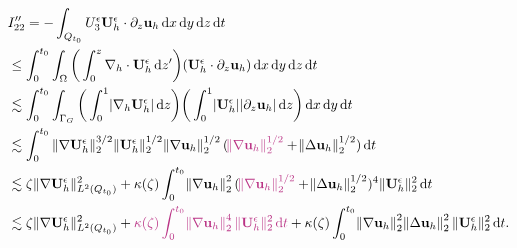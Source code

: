 \documentclass{beamer}
\newcommand*\diff{\mathop{}\!\mathrm{d}}
\begin{document}
\begin{frame}
\changefontsizes{9pt}

  \begin{equation} \nonumber
    \begin{split}
      & I_{22}'' = - \int_{Q_{t_0}}  U^\epsilon_3 \mathbf{U}_h^\epsilon \cdot \partial_z \mathbf{u}_h \diff x \diff y \diff z \diff t \\
      & \leq \int_0^{t_0} \int_\Omega \bigg ( \int_0^z \nabla_h \cdot \mathbf{U}_h^\epsilon \diff z' \bigg ) (\mathbf{U}_h^\epsilon \cdot \partial_z \mathbf{u}_h) \diff x \diff y \diff z \diff t \\
      & \lesssim \int_0^{t_0} \int_{\Gamma_G} \bigg ( \int_0^1 \abs{\nabla_h \mathbf{U}_h^\epsilon} \diff z \bigg) \bigg ( \int_0^1 \abs{\mathbf{U}_h^\epsilon} \abs{\partial_z \mathbf{u}_h} \diff z \bigg ) \diff x \diff y \diff t \\
      & \lesssim \int_0^{t_0} \| \nabla \mathbf{U}_h^\epsilon \| _2^{3/2} \| \mathbf{U}_h^\epsilon \| _2^{1/2} \norm{\nabla \mathbf{u}_h}_2^{1/2} (\textcolor{mediumred-violet}{\norm{\nabla \mathbf{u}_h}_2^{1/2}} + \norm{\Delta \mathbf{u}_h}_2^{1/2}) \diff t \\
      & \lesssim \zeta \| \nabla \mathbf{U}_h^\epsilon \|_{L^2(Q_{t_0})}^2 + \kappa(\zeta) \int_0^{t_0} \norm{\nabla \mathbf{u}_h}_2^2 (\textcolor{mediumred-violet}{\norm{\nabla \mathbf{u}_h}_2^{1/2}} + \norm{\Delta \mathbf{u}_h}_2^{1/2})^4 \| \mathbf{U}_h^\epsilon \|_2^2 \diff t \\
      & \lesssim \zeta \| \nabla \mathbf{U}_h^\epsilon \|_{L^2(Q_{t_0})}^2 + \textcolor{mediumred-violet}{\kappa(\zeta) \int_0^{t_0} \norm{\nabla \mathbf{u}_h}_2^4 \| \mathbf{U}_h^\epsilon \|_2^2 \diff t} + \kappa(\zeta) \int_0^{t_0} \norm{\nabla \mathbf{u}_h}_2^2  \norm{\Delta \mathbf{u}_h}_2^2 \| \mathbf{U}_h^\epsilon \| _2^2 \diff t.
    \end{split}
  \end{equation}

\end{frame}
\end{document}
